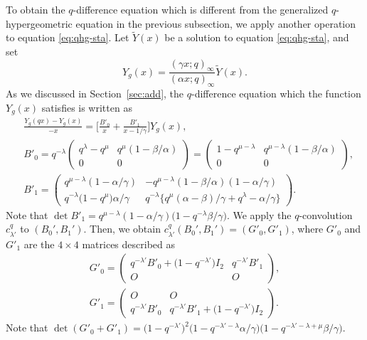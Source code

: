 \documentclass[pdftex]{sigma}
\numberwithin{equation}{section}
\theoremstyle{definition}
\begin{document}
To obtain the $q$-difference equation which is different from the generalized $q$-hypergeometric equation in the previous subsection, we apply another operation to equation \eqref{eq:qhg-sta}.
Let $\widetilde{Y}(x)$ be a solution to equation \eqref{eq:qhg-sta}, and set
\begin{equation}
 Y_g(x) = \frac{(\gamma x;q)_{\infty}}{(\alpha x;q)_{\infty}}\widetilde{Y}(x).
\label{eq:Yggaal}
\end{equation}
As we discussed in Section~\ref{sec:add}, the $q$-difference equation which the function $Y_g(x) $ satisfies is written as
\begin{align}
& \frac{Y_g(qx) - Y_g(x)}{-x} = \bigg[ \frac{B'_0}{x} + \frac{B'_1}{x-1/\gamma} \bigg] Y_g(x) , \label{eq:B'0B'1ag} \\
&  B'_0
= q^{-\lambda}
 \begin{pmatrix}
 q^{\lambda} - q^{\mu} & q^{\mu} (1-\beta /\alpha ) \\
 0 & 0
 \end{pmatrix}
=
 \begin{pmatrix}
 1 - q^{\mu -\lambda } & q^{\mu -\lambda } (1- \beta/ \alpha ) \\
 0 & 0
 \end{pmatrix}, \nonumber\\
&  B'_1 = \begin{pmatrix}
 q^{\mu-\lambda}(1-\alpha /\gamma ) & -q^{\mu-\lambda} (1-\beta / \alpha )(1-\alpha /\gamma ) \\
 q^{-\lambda} \bigl(1-q^{\mu}\bigr)\alpha /\gamma & q^{-\lambda}\bigl\{q^{\mu}(\alpha -\beta)/\gamma +q^{\lambda}-\alpha / \gamma \bigr\}
\end{pmatrix}. \nonumber
\end{align}
Note that $\det B'_1 = q^{\mu-\lambda} (1-\alpha/ \gamma ) \bigl(1- q^{-\lambda} \beta /\gamma \bigr) $.
We apply the $q$-convolution $c^q_{\lambda'}$ to $(B_0', B_1')$.
Then, we obtain $c^q_{\lambda'} (B_0', B_1')= (G'_0, G'_1)$, where $G'_0$ and $G'_1$ are the $4 \times 4$ matrices described as
\begin{gather}
G'_0
= \begin{pmatrix}
 q^{-\lambda'}B'_0 + \bigl(1 - q^{-\lambda'}\bigr)I_2 & q^{-\lambda'}B'_1 \\
 O & O
\end{pmatrix} ,\nonumber\\
G'_1
 = \begin{pmatrix}
 O & O \\
 q^{-\lambda'}B'_0 & q^{-\lambda'}B'_1 + \bigl(1-q^{-\lambda'}\bigr) I_2
\end{pmatrix}. \label{eq:G'0G'1matman}
\end{gather}
Note that $\det ( G'_0 + G'_1 ) = \bigl(1- q^{-\lambda'}\bigr)^2 \bigl(1- q^{-\lambda'-\lambda} \alpha/\gamma\bigr) \bigl(1- q^{-\lambda'-\lambda +\mu } \beta /\gamma \bigr)$.
\end{document}
